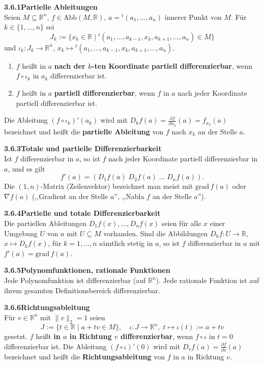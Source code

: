 \documentclass[a4paper,12pt]{article}
\newcommand{\gentry}[3]{%
  \noindent\textbf{#1\quad #2}\nopagebreak\\[0.2em]
  #3\par\smallskip
}
\begin{document}
\gentry{3.6.1}{Partielle Ableitungen}{%
  Seien $M \subseteq \mathbb{R}^n$, $f \in \mathrm{Abb}(M, \mathbb{R})$,
  $a = {}^t(a_1, \ldots, a_n)$ innerer Punkt von $M$. F\"ur $k \in \{1, \ldots, n\}$ sei
  \[
    J_k := \{x_k \in \mathbb{R} \mid {}^t(a_1, \ldots, a_{k-1}, x_k, a_{k+1}, \ldots, a_n) \in M\}
  \]
  und $\iota_k : J_k \to \mathbb{R}^n$,
  $x_k \mapsto {}^t(a_1, \ldots, a_{k-1}, x_k, a_{k+1}, \ldots, a_n)$.
  \begin{enumerate}[label=(\roman*),topsep=2pt,itemsep=1pt]
    \item $f$ hei{\ss}t in $a$ \textbf{nach der $k$-ten Koordinate partiell differenzierbar},
          wenn $f \circ \iota_k$ in $a_k$ differenzierbar ist.
    \item $f$ hei{\ss}t in $a$ \textbf{partiell differenzierbar}, wenn $f$ in $a$ nach
          jeder Koordinate partiell differenzierbar ist.
  \end{enumerate}
  Die Ableitung $(f \circ \iota_k)'(a_k)$ wird mit
  $D_k f(a) = \tfrac{\partial f}{\partial x_k}(a) = f_{x_k}(a)$ bezeichnet und hei{\ss}t
  die \textbf{partielle Ableitung} von $f$ nach $x_k$ an der Stelle $a$.
}

\gentry{3.6.3}{Totale und partielle Differenzierbarkeit}{%
  Ist $f$ differenzierbar in $a$, so ist $f$ nach jeder Koordinate partiell
  differenzierbar in $a$, und es gilt
  \[
    f'(a) = (D_1 f(a)\; D_2 f(a)\; \ldots\; D_n f(a)).
  \]
  Die $(1, n)$-Matrix (Zeilenvektor) bezeichnet man meist mit
  $\mathrm{grad}\, f(a)$ oder $\nabla f(a)$ (,,Gradient an der Stelle $a$'',
  ,,Nabla $f$ an der Stelle $a$'').
}

\gentry{3.6.4}{Partielle und totale Differenzierbarkeit}{%
  Die partiellen Ableitungen $D_1 f(x), \ldots, D_n f(x)$ seien f\"ur alle $x$ einer
  Umgebung $U$ von $a$ mit $U \subseteq M$ vorhanden. Sind die Abbildungen
  $D_k f : U \to \mathbb{R}$, $x \mapsto D_k f(x)$, f\"ur $k = 1, \ldots, n$ s\"amtlich
  stetig in $a$, so ist $f$ differenzierbar in $a$ mit
  $f'(a) = \mathrm{grad}\, f(a)$.
}

\gentry{3.6.5}{Polynomfunktionen, rationale Funktionen}{%
  Jede Polynomfunktion ist differenzierbar (auf $\mathbb{R}^n$). Jede rationale
  Funktion ist auf ihrem gesamten Definitionsbereich differenzierbar.
}

\gentry{3.6.6}{Richtungsableitung}{%
  F\"ur $v \in \mathbb{R}^n$ mit $\|v\|_2 = 1$ seien
  \[
    J := \{t \in \mathbb{R} \mid a + tv \in M\}, \quad
    \iota : J \to \mathbb{R}^n,\; t \mapsto \iota(t) := a + tv
  \]
  gesetzt. $f$ hei{\ss}t \textbf{in $a$ in Richtung $v$ differenzierbar}, wenn $f \circ \iota$
  in $t = 0$ differenzierbar ist. Die Ableitung $(f \circ \iota)'(0)$ wird mit
  $D_v f(a) = \tfrac{\partial f}{\partial v}(a)$ bezeichnet und hei{\ss}t die
  \textbf{Richtungsableitung} von $f$ in $a$ in Richtung $v$.
}
\end{document}
